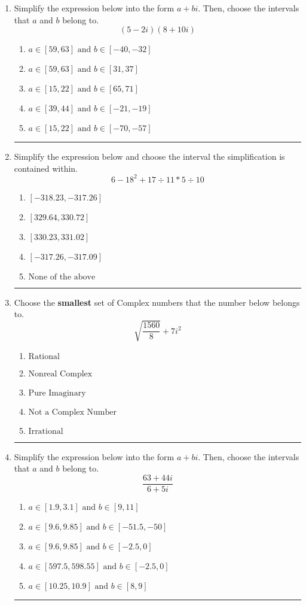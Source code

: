 \documentclass[14pt]{extbook}
\newcommand{\litem}[1]{\item#1\hspace*{-1cm}\rule{\textwidth}{0.4pt}}
\begin{document}
\begin{enumerate}
{\begin{enumerate}[label=\Alph*.]
\end{enumerate} }
\litem{
Simplify the expression below into the form $a+bi$. Then, choose the intervals that $a$ and $b$ belong to.\[ (5 - 2 i)(8 + 10 i) \]\begin{enumerate}[label=\Alph*.]
\item \( a \in [59, 63] \text{ and } b \in [-40, -32] \)
\item \( a \in [59, 63] \text{ and } b \in [31, 37] \)
\item \( a \in [15, 22] \text{ and } b \in [65, 71] \)
\item \( a \in [39, 44] \text{ and } b \in [-21, -19] \)
\item \( a \in [15, 22] \text{ and } b \in [-70, -57] \)

\end{enumerate} }
\litem{
Simplify the expression below and choose the interval the simplification is contained within.\[ 6 - 18^2 + 17 \div 11 * 5 \div 10 \]\begin{enumerate}[label=\Alph*.]
\item \( [-318.23, -317.26] \)
\item \( [329.64, 330.72] \)
\item \( [330.23, 331.02] \)
\item \( [-317.26, -317.09] \)
\item \( \text{None of the above} \)

\end{enumerate} }
\litem{
Choose the \textbf{smallest} set of Complex numbers that the number below belongs to.\[ \sqrt{\frac{1560}{8}}+7i^2 \]\begin{enumerate}[label=\Alph*.]
\item \( \text{Rational} \)
\item \( \text{Nonreal Complex} \)
\item \( \text{Pure Imaginary} \)
\item \( \text{Not a Complex Number} \)
\item \( \text{Irrational} \)

\end{enumerate} }
\litem{
Simplify the expression below into the form $a+bi$. Then, choose the intervals that $a$ and $b$ belong to.\[ \frac{63 + 44 i}{6 + 5 i} \]\begin{enumerate}[label=\Alph*.]
\item \( a \in [1.9, 3.1] \text{ and } b \in [9, 11] \)
\item \( a \in [9.6, 9.85] \text{ and } b \in [-51.5, -50] \)
\item \( a \in [9.6, 9.85] \text{ and } b \in [-2.5, 0] \)
\item \( a \in [597.5, 598.55] \text{ and } b \in [-2.5, 0] \)
\item \( a \in [10.25, 10.9] \text{ and } b \in [8, 9] \)


\end{enumerate}}
\end{enumerate}
\end{document}
